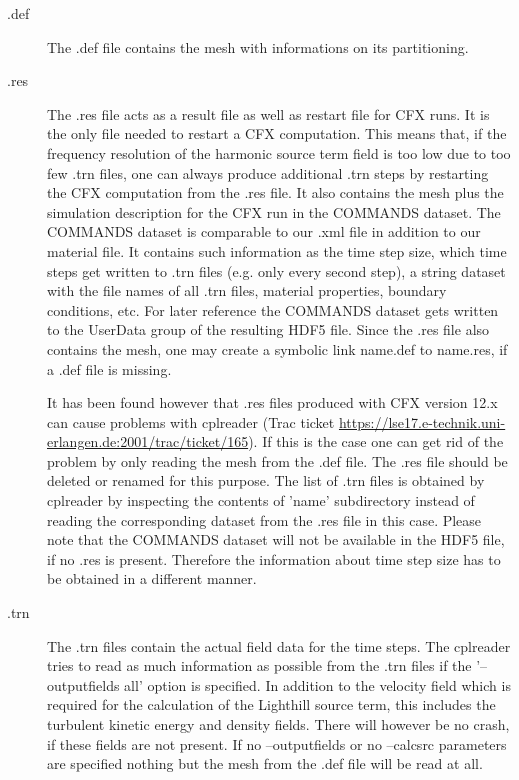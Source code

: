 \documentclass[a4paper,10pt]{article}
\begin{document}
\begin{description}
  \item[.def]  The  .def file  contains  the  mesh  with informations  on  its
    partitioning.

  \item[.res] The .res file acts as a  result file as well as restart file for
    CFX runs.  It  is the only file needed to restart  a CFX computation. This
    means that, if the frequency  resolution of the harmonic source term field
    is too  low due to too few  .trn files, one can  always produce additional
    .trn steps by restarting the CFX  computation from the .res file.  It also
    contains the mesh  plus the simulation description for the  CFX run in the
    COMMANDS dataset. The  COMMANDS dataset is comparable to  our .xml file in
    addition to  our material file. It  contains such information  as the time
    step size,  which time steps get  written to .trn files  (e.g.  only every
    second step),  a string  dataset with  the file names  of all  .trn files,
    material properties,  boundary conditions,  etc.  For later  reference the
    COMMANDS dataset gets written to  the UserData group of the resulting HDF5
    file.   Since the  .res file  also  contains the  mesh, one  may create  a
    symbolic link name.def to name.res, if a .def file is missing.

    It has been  found however that .res files produced  with CFX version 12.x
    can      cause     problems      with      cplreader     (Trac      ticket
    \url{https://lse17.e-technik.uni-erlangen.de:2001/trac/ticket/165}).     If
    this is the case  one can get rid of the problem  by only reading the mesh
    from the  .def file. The .res file  should be deleted or  renamed for this
    purpose. The list of .trn files is obtained by cplreader by inspecting the
    contents  of  'name' subdirectory  instead  of  reading the  corresponding
    dataset from  the .res file in  this case.  Please note  that the COMMANDS
    dataset  will  not  be  available  in   the  HDF5  file,  if  no  .res  is
    present. Therefore the information about time step size has to be obtained
    in a different manner.

  \item[.trn]  The .trn  files  contain the  actual  field data  for the  time
    steps. The  cplreader tries to read  as much information  as possible from
    the  .trn files  if  the  '--outputfields all'  option  is specified.   In
    addition to  the velocity field which  is required for  the calculation of
    the Lighthill source term, this  includes the turbulent kinetic energy and
    density fields.  There  will however be no crash, if  these fields are not
    present.  If  no --outputfields or  no --calcsrc parameters  are specified
    nothing but the mesh from the .def file will be read at all.
\end{description}
\end{document}
